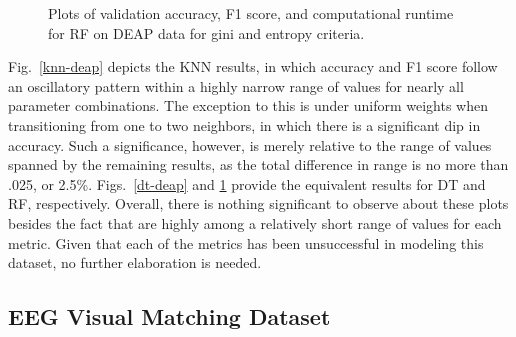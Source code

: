 \documentclass[12pt]{uthesis-v12}  %
\begin{document}
\begin{figure}
	\hfill	
{}
						
\caption{Plots of validation accuracy, F1 score, and computational runtime for RF on DEAP data for gini and entropy criteria.}
	\label{rfr-deap}
	\end{figure}
	
Fig.~\ref{knn-deap} depicts the KNN results, in which accuracy and F1 score follow an oscillatory pattern within a highly narrow range of values for nearly all parameter combinations. The exception to this is under uniform weights when transitioning from one to two neighbors, in which there is a significant dip in accuracy. Such a significance, however, is merely relative to the range of values spanned by the remaining results, as the total difference in range is no more than .025, or 2.5\%. Figs.~\ref{dt-deap} and \ref{rfr-deap} provide the equivalent results for DT and RF, respectively. Overall, there is nothing significant to observe about these plots besides the fact that are highly among a relatively short range of values for each metric. Given that each of the metrics has been unsuccessful in modeling this dataset, no further elaboration is needed.

\subsection{EEG Visual Matching Dataset}
\end{document}
